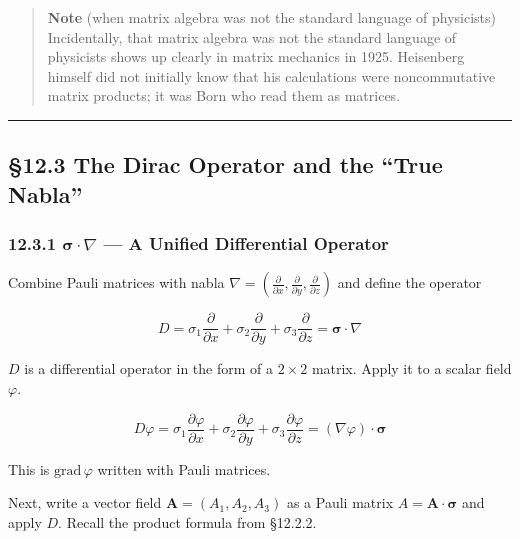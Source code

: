\begin{quote}
\textbf{Note} (when matrix algebra was not the standard language of
physicists) Incidentally, that matrix algebra was not the standard
language of physicists shows up clearly in matrix mechanics in 1925.
Heisenberg himself did not initially know that his calculations were
noncommutative matrix products; it was Born who read them as matrices.
\end{quote}

\begin{center}\rule{0.5\linewidth}{0.5pt}\end{center}

\hypertarget{the-dirac-operator-and-the-true-nabla}{%
\subsection{§12.3 The Dirac Operator and the ``True
Nabla''}\label{the-dirac-operator-and-the-true-nabla}}

\hypertarget{bmsigmacdotnabla-a-unified-differential-operator}{%
\subsubsection{\texorpdfstring{12.3.1 \(\bm{\sigma}\!\cdot\!\nabla\) ---
A Unified Differential
Operator}{12.3.1 \textbackslash bm\{\textbackslash sigma\}\textbackslash!\textbackslash cdot\textbackslash!\textbackslash nabla --- A Unified Differential Operator}}\label{bmsigmacdotnabla-a-unified-differential-operator}}

Combine Pauli matrices with nabla
\(\nabla = (\frac{\partial}{\partial x}, \frac{\partial}{\partial y}, \frac{\partial}{\partial z})\)
and define the operator

\[D = \sigma_1\frac{\partial}{\partial x} + \sigma_2\frac{\partial}{\partial y} + \sigma_3\frac{\partial}{\partial z} = \bm{\sigma}\!\cdot\!\nabla\]

\(D\) is a differential operator in the form of a \(2\times2\) matrix.
Apply it to a scalar field \(\varphi\).

\[D\varphi = \sigma_1\frac{\partial\varphi}{\partial x} + \sigma_2\frac{\partial\varphi}{\partial y} + \sigma_3\frac{\partial\varphi}{\partial z} = (\nabla\varphi)\!\cdot\!\bm{\sigma}\]

This is \(\mathrm{grad}\,\varphi\) written with Pauli matrices.

Next, write a vector field \(\mathbf{A} = (A_1, A_2, A_3)\) as a Pauli
matrix \(A = \mathbf{A}\!\cdot\!\bm{\sigma}\) and apply \(D\). Recall
the product formula from §12.2.2.

